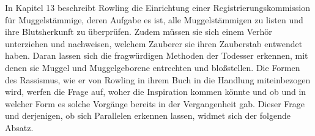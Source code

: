 In Kapitel 13 beschreibt Rowling die Einrichtung einer \glqq Registrierungskommission für Muggelstämmige\grqq , deren Aufgabe es ist, alle Muggelstämmigen zu listen und ihre Blutsherkunft zu überprüfen. 
Zudem müssen sie sich einem Verhör unterziehen und nachweisen, welchem Zauberer sie ihren Zauberstab entwendet haben\cite [S.268]{JKR10}. 
Daran lassen sich die fragwürdigen Methoden der Todesser erkennen, mit denen sie Muggel und Muggelgeborene entrechten und bloßstellen. 
Die Formen des Rassismus, wie er von Rowling in ihrem Buch in die Handlung miteinbezogen wird, werfen die Frage auf, woher die Inspiration kommen könnte und ob und in welcher Form es solche Vorgänge bereits in der Vergangenheit gab. Dieser Frage und derjenigen, ob sich Parallelen erkennen lassen, widmet sich der folgende Absatz.






